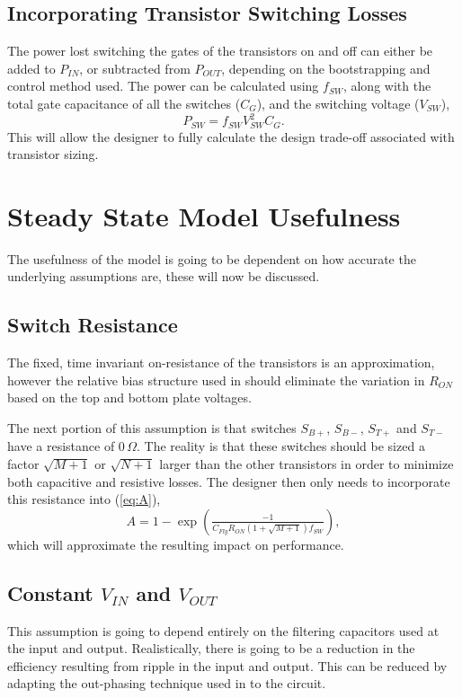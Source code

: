 \documentclass[conference]{IEEEtran}
\begin{document}
 	\subsection{Incorporating Transistor Switching Losses}
 	The power lost switching the gates of the transistors on and off can either be added to $P_{IN}$, or subtracted from $P_{OUT}$, depending on the bootstrapping and control method used. The power can be calculated using $f_{SW}$, along with the total gate capacitance of all the switches ($C_{G}$), and the switching voltage ($V_{SW}$),
 	\begin{equation}
 	P_{SW} = f_{SW}V_{SW}^2C_G.
 	\end{equation}
 	This will allow the designer to fully calculate the design trade-off associated with transistor sizing. 
 	
 	
 	\section{Steady State Model Usefulness}
 	The usefulness of the model is going to be dependent on how accurate the underlying assumptions are, these will now be discussed. 
 	\subsection{Switch Resistance}
 	The fixed, time invariant on-resistance of the transistors is an approximation, however the relative bias structure used in \cite{Butzen2019} should eliminate the variation in $R_{ON}$ based on the top and bottom plate voltages.
 	
 	The next portion of this assumption is that switches $S_{B+}$, $S_{B-}$, $S_{T+}$ and $S_{T-}$ have a resistance of 0$\,\Omega$. The reality is that these switches should be sized a factor $\sqrt{M+1}$ or $\sqrt{N+1}$ larger than the other transistors in order to minimize both capacitive and resistive losses. The designer then only needs to incorporate this resistance into (\ref{eq:A}), 
 	\begin{equation}
 	A = 1-\exp\left(\tfrac{-1}{C_{Fly}R_{ON}(1+\sqrt{M+1}) f_{SW}}\right),
 	\end{equation}
 	which will approximate the resulting impact on performance.
 	\subsection{Constant $V_{IN}$ and $V_{OUT}$}
 	This assumption is going to depend entirely on the filtering capacitors used at the input and output. Realistically, there is going to be a reduction in the efficiency resulting from ripple in the input and output. This can be reduced by adapting the out-phasing technique used in \cite{Le2010} to the circuit.
 	
\end{document}
